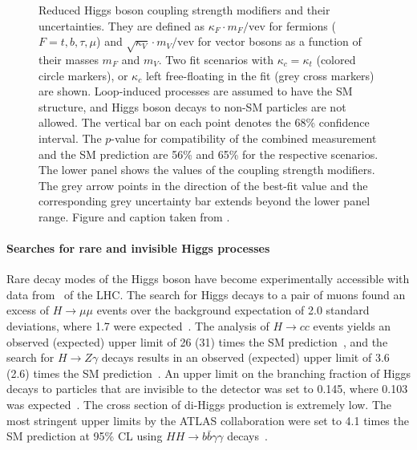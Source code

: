 \begin{figure}
  \caption{
    Reduced Higgs boson coupling strength modifiers and their uncertainties. They are defined as $\kappa_F \cdot m_F / \text{vev}$ for fermions
($F=t,b,\tau,\mu$) and $\sqrt{\kappa_V}\cdot m_V/\text{vev}$ for vector bosons as a
function of their masses $m_F$ and $m_V$. Two fit scenarios with $\kappa_c =
\kappa_t$ (colored circle markers), or $\kappa_c$ left free-floating in the fit (grey
cross markers) are shown. Loop-induced processes are assumed to have the SM structure, and Higgs boson decays to non-SM particles are not allowed. The vertical bar on each point denotes the 68\% confidence interval. The $p$-value for compatibility of the combined measurement and the SM prediction are 56\% and 65\% for the respective scenarios. The lower panel shows the values of the coupling strength modifiers. The grey arrow points in the direction of the best-fit value and the corresponding grey uncertainty bar extends beyond the lower panel range. Figure and caption taken from .}
  \label{fig:h-couplings}
\end{figure}

\paragraph{Searches for rare and invisible Higgs processes}
Rare decay modes of the Higgs boson have become experimentally accessible with data from \RunTwo\ of the LHC. 
The search for Higgs decays to a pair of muons found an excess of $H \to \mu\mu$ events over the background expectation of 2.0 standard deviations, where 1.7 were expected~\cite{HIGG-2019-14}.
The analysis of $H \to cc$ events yields an observed (expected) upper limit of 26 (31) times the SM prediction~\cite{ATLAS-CONF-2021-021}, and the search for $H \to Z\gamma$ decays results in an observed (expected) upper limit of 3.6 (2.6) times the SM prediction~\cite{HIGG-2018-42}.
An upper limit on the branching fraction of Higgs decays to particles that are invisible to the detector was set to 0.145, where 0.103 was expected~\cite{ATLASInvisible1}.
The cross section of di-Higgs production is extremely low. The most stringent upper limits by the ATLAS collaboration were set to 4.1 times the SM prediction at 95\% CL using $HH \to b\bar{b}\gamma\gamma$ decays~\cite{ATLAS-CONF-2021-016}.


